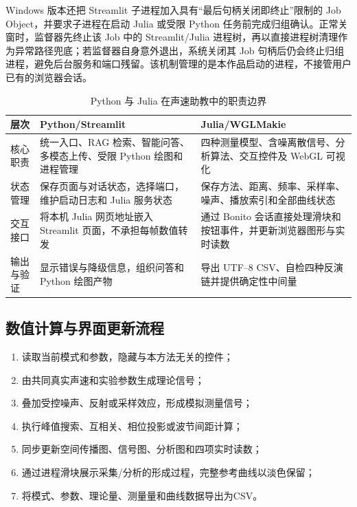 \documentclass[UTF8,a4paper,zihao=-4]{ctexart}
\begin{document}
Windows 版本还把 Streamlit 子进程加入具有“最后句柄关闭即终止”限制的 Job Object，并要求子进程在启动 Julia 或受限 Python 任务前完成归组确认。正常关窗时，监督器先终止该 Job 中的 Streamlit/Julia 进程树，再以直接进程树清理作为异常路径兜底；若监督器自身意外退出，系统关闭其 Job 句柄后仍会终止归组进程，避免后台服务和端口残留。该机制管理的是本作品启动的进程，不接管用户已有的浏览器会话。

\begin{table}[H]
\centering
\caption{Python 与 Julia 在声速助教中的职责边界}
\begin{tabularx}{\textwidth}{p{2.5cm}XX}
\toprule
层次 & Python/Streamlit & Julia/WGLMakie\\
\midrule
核心职责 & 统一入口、RAG 检索、智能问答、多模态上传、受限 Python 绘图和进程管理 & 四种测量模型、含噪离散信号、分析算法、交互控件及 WebGL 可视化\\
状态管理 & 保存页面与对话状态，选择端口，维护启动日志和 Julia 服务状态 & 保存方法、距离、频率、采样率、噪声、播放索引和全部曲线状态\\
交互接口 & 将本机 Julia 网页地址嵌入 Streamlit 页面，不承担每帧数值转发 & 通过 Bonito 会话直接处理滑块和按钮事件，并更新浏览器图形与实时读数\\
输出与验证 & 显示错误与降级信息，组织问答和 Python 绘图产物 & 导出 UTF--8 CSV、自检四种反演链并提供确定性中间量\\
\bottomrule
\end{tabularx}
\end{table}

\subsection{数值计算与界面更新流程}
\begin{enumerate}
  \item 读取当前模式和参数，隐藏与本方法无关的控件；
  \item 由共同真实声速和实验参数生成理论信号；
  \item 叠加受控噪声、反射或采样效应，形成模拟测量信号；
  \item 执行峰值搜索、互相关、相位投影或波节间距计算；
  \item 同步更新空间传播图、信号图、分析图和四项实时读数；
  \item 通过进程滑块展示采集/分析的形成过程，完整参考曲线以淡色保留；
  \item 将模式、参数、理论量、测量量和曲线数据导出为CSV。
\end{enumerate}
\end{document}
